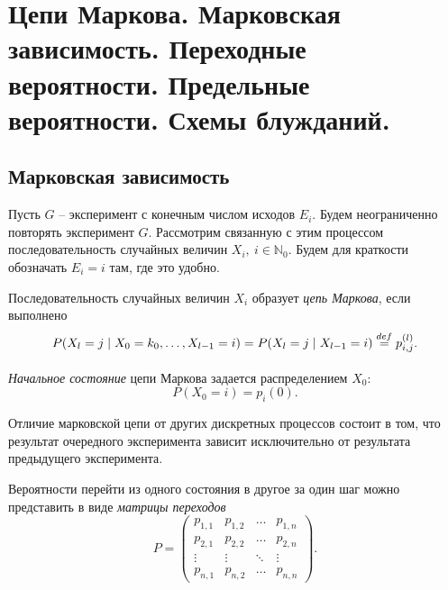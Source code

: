 \section{Цепи Маркова. Марковская зависимость. Переходные вероятности.
Предельные вероятности. Схемы блужданий.}

\subsection{Марковская зависимость}

Пусть $G$ -- эксперимент с конечным числом исходов $E_i$. Будем неограниченно
повторять эксперимент $G$. Рассмотрим связанную с этим процессом
последовательность случайных величин $X_i,~ i \in \mathbb{N}_0$. Будем для
краткости обозначать $E_i = i$ там, где это удобно.

\begin{definition}
    Последовательность случайных величин $X_i$ образует \textit{цепь Маркова}, 
    если выполнено
    \[
        P(X_l = j \mid X_0 = k_0, \ldots, X_{l - 1} = i) =
        P(X_l = j \mid X_{l - 1} = i) \overset{def}{\underset{}{=}} p^{(l)}_{i, j}
    .\]
\end{definition}

\begin{definition}
    \textit{Начальное состояние} цепи Маркова задается распределением
    $X_0$:
    \[
        P(X_0 = i) = p_i(0)
    .\]
\end{definition}

\begin{remark}
    Отличие марковской цепи от других дискретных процессов состоит в том, что
    результат очередного эксперимента зависит исключительно от результата
    предыдущего эксперимента.
\end{remark}

\begin{definition}
     Вероятности перейти из одного состояния в другое за один шаг можно
     представить в виде \textit{матрицы переходов}
     \[
         P = \begin{pmatrix}
            p_{1, 1} & p_{1, 2} & \ldots & p_{1, n} \\
            p_{2, 1} & p_{2, 2} & \ldots & p_{2, n} \\
            \vdots & \vdots & \ddots & \vdots \\
            p_{n, 1} & p_{n, 2} & \ldots & p_{n, n}
         \end{pmatrix}   
     .\]
\end{definition}

